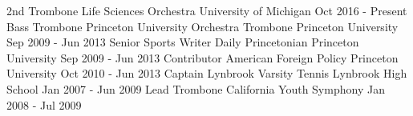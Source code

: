 \begin{cventries}
  \cventry
    {2nd Trombone} %
    {Life Sciences Orchestra} %
    {University of Michigan} %
    {Oct 2016 - Present} %
{}
  \cventry
    {Bass Trombone} %
    {Princeton University Orchestra Trombone} %
    {Princeton University} %
    {Sep 2009 - Jun 2013} %
{}
  \cventry
    {Senior Sports Writer} %
    {Daily Princetonian} %
    {Princeton University} %
    {Sep 2009 - Jun 2013} %
{}
  \cventry
    {Contributor} %
    {American Foreign Policy} %
    {Princeton University} %
    {Oct 2010 - Jun 2013} %
{}
  \cventry
    {Captain} %
    {Lynbrook Varsity Tennis} %
    {Lynbrook High School} %
    {Jan 2007 - Jun 2009} %
{}
  \cventry
    {Lead Trombone} %
    {California Youth Symphony} %
    {} %
    {Jan 2008 - Jul 2009} %
{}
\end{cventries}